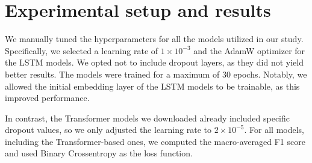 \documentclass[11pt]{article}
\begin{document}






\section{Experimental setup and results}
\label{sec:results}

We manually tuned the hyperparameters for all the models utilized in our study. Specifically, we selected a learning rate of \(1 \times 10^{-3}\) and the AdamW optimizer for the LSTM models. We opted not to include dropout layers, as they did not yield better results. The models were trained for a maximum of 30 epochs. Notably, we allowed the initial embedding layer of the LSTM models to be trainable, as this improved performance.

In contrast, the Transformer models we downloaded already included specific dropout values, so we only adjusted the learning rate to \(2 \times 10^{-5}\). For all models, including the Transformer-based ones, we computed the macro-averaged F1 score and used Binary Crossentropy as the loss function.
\end{document}
